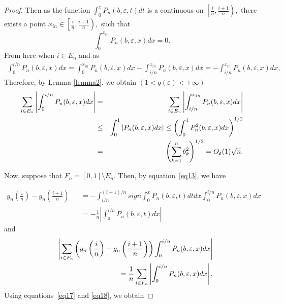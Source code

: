 \documentclass{publmathdeb}
\begin{document}
\begin{proof}
		Then as the function $\int_{0}^{x} P_n(b, \varepsilon, t) dt$  is a continuous on  $\left[\frac{i}{n}, \frac{i+1}{n} \right),$  there exists a point $x_{in}\in \left[\frac{i}{n}, \frac{i+1}{n} \right),$ such that   
		$$\int_{0}^{x_{in}} P_n(b, \varepsilon, x) dx = 0.$$
		From here when $i\in E_n$ and as
		\begin{eqnarray*}
			\int_{0}^{i/n} P_n(b, \varepsilon, x) dx  = \int_{0}^{x_{in}} P_n(b, \varepsilon, x) dx-\int_{i/n}^{x_{in}} P_n(b, \varepsilon, x) dx = -\int_{i/n}^{x_{in}} P_n(b, \varepsilon, x) dx,
		\end{eqnarray*}
		Therefore, by Lemma \ref{lemma2}, we obtain  $(1<q(\varepsilon)<+\infty)$
		\begin{eqnarray}
			\label{eq17}
			\sum_{i\in E_n}\left|\int_{0}^{i/n} P_n(b, \varepsilon, x) dx\right| &=& \sum_{i\in E_n} \left|\int_{i/n}^{x_{in}} P_n(b, \varepsilon, x) dx\right|   \\
			&\leq &\int_{0}^{1} \left|P_n(b, \varepsilon, x) dx\right| \leq \left( \int_{0}^{1}P_n^2(b, \varepsilon, x) dx\right)^{1/2} \notag \\
			&=& \left(\sum_{k=1}^{n}b_k^2\right)^{1/2} =O_\varepsilon(1)\sqrt{n} . \notag
		\end{eqnarray}
		
		Now, suppose that \( F_n = [0,1] \setminus E_n \). Then, by equation~\eqref{eq13}, we have
		
		\begin{eqnarray*}
			g_n \left(\frac{i}{n}\right) -g_n \left(\frac{i+1}{n}\right) 
			&& = - \int_{i/n}^{(i+1)/n} sign \int_{0}^{x} P_n(b, \varepsilon,t) dt dx \int_{0}^{i/n}  P_n(b, \varepsilon,x) dx \\
			&&= - \frac{1}{n} \left|\int_{0}^{i/n}  P_n(b, \varepsilon,t)dx\right|
		\end{eqnarray*}
		and
		\begin{eqnarray}
			\label{eq18} 
			&&\left|\sum_{i\in F_n} \left(g_n \left(\frac{i}{n}\right) -g_n \left(\frac{i+1}{n}\right)\right)\int_{0}^{i/n}  P_n(b, \varepsilon,x)dx\right| \\
			&&= \frac{1}{n} \sum_{i\in F_n} \left| \int_{0}^{i/n} P_n(b, \varepsilon,x)dx\right|.  \notag 
		\end{eqnarray}
		Using equations~\eqref{eq17} and \eqref{eq18}, we obtain
		

\end{proof}
\end{document}

